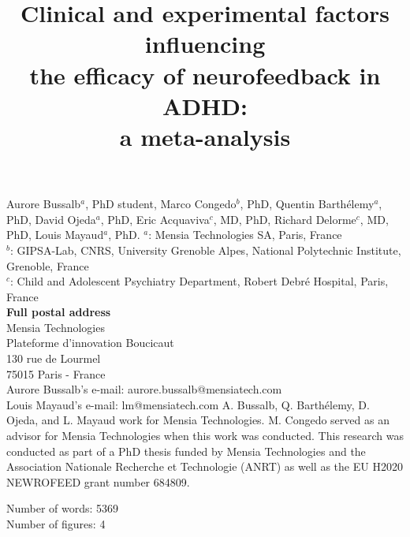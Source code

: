 

\title{Clinical and experimental factors influencing \\ the efficacy of neurofeedback in ADHD: \\ a meta-analysis} %
\maketitle
\noindent Aurore Bussalb$^a$, PhD student, Marco Congedo$^b$, PhD, Quentin Barth\'elemy$^a$, PhD, David Ojeda$^a$, PhD, 
Eric Acquaviva$^c$, MD, PhD, Richard Delorme$^c$, MD, PhD, Louis Mayaud$^a$, PhD. 
\smallbreak
\noindent $^a$: Mensia Technologies SA, Paris, France \\
\noindent $^b$: GIPSA-Lab, CNRS, University Grenoble Alpes, National Polytechnic Institute, Grenoble, France \\
\noindent $^c$: Child and Adolescent Psychiatry Department, Robert Debré Hospital, Paris, France \\ 
\smallbreak
\noindent\textbf{Full postal address} \\
Mensia Technologies \\
Plateforme d'innovation Boucicaut \\
130 rue de Lourmel \\
75015 Paris - France \\
Aurore Bussalb's e-mail: aurore.bussalb@mensiatech.com \\
Louis Mayaud's e-mail: lm@mensiatech.com 
\smallbreak
\noindent A. Bussalb, Q. Barth\'elemy, D. Ojeda, and L. Mayaud work for Mensia Technologies.
M. Congedo served as an advisor for Mensia Technologies when this work was conducted. 
\smallbreak
\noindent This research was conducted as part of a PhD thesis funded by Mensia Technologies and the Association Nationale 
Recherche et Technologie (ANRT) as well as the EU H2020 NEWROFEED grant number 684809.

\noindent Number of words: 5369 \\
\noindent Number of figures: 4 
